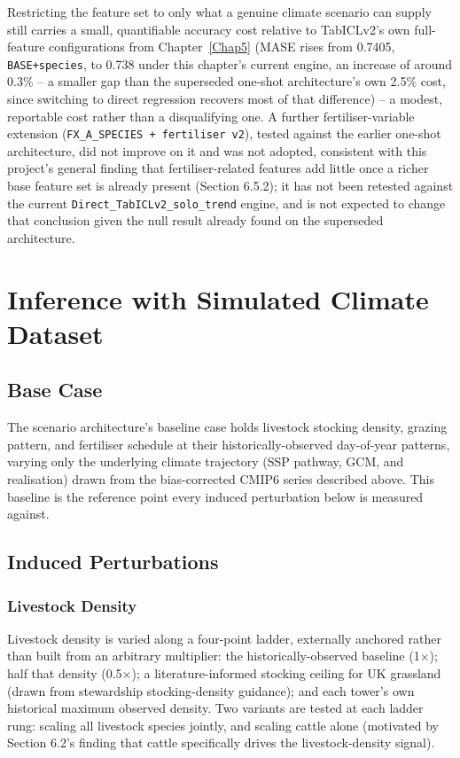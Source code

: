 Restricting the feature set to only what a genuine climate scenario can supply still carries a
small, quantifiable accuracy cost relative to TabICLv2's own full-feature configurations from
Chapter~\ref{Chap5} (MASE rises from 0.7405, \texttt{BASE+species}, to 0.738 under this chapter's
current engine, an increase of around 0.3\% -- a smaller gap than the superseded one-shot
architecture's own 2.5\% cost, since switching to direct regression recovers most of that
difference) -- a modest, reportable cost rather than a disqualifying one. A further
fertiliser-variable extension (\texttt{FX\_A\_SPECIES + fertiliser v2}), tested against the earlier
one-shot architecture, did not improve on it and was not adopted, consistent with this project's
general finding that fertiliser-related features add little once a richer base feature set is
already present (Section 6.5.2); it has not been retested against the current
\texttt{Direct\_TabICLv2\_solo\_trend} engine, and is not expected to change that conclusion given
the null result already found on the superseded architecture.

\section{Inference with Simulated Climate Dataset}

\subsection{Base Case}

The scenario architecture's baseline case holds livestock stocking density, grazing pattern, and
fertiliser schedule at their historically-observed day-of-year patterns, varying only the underlying
climate trajectory (SSP pathway, GCM, and realisation) drawn from the bias-corrected CMIP6 series
described above. This baseline is the reference point every induced perturbation below is measured
against.

\subsection{Induced Perturbations}

\subsubsection{Livestock Density}

Livestock density is varied along a four-point ladder, externally anchored rather than built from
an arbitrary multiplier: the historically-observed baseline (1$\times$); half that density
(0.5$\times$); a literature-informed stocking ceiling for UK grassland (drawn from stewardship
stocking-density guidance); and each tower's own historical maximum observed density. Two variants
are tested at each ladder rung: scaling all livestock species jointly, and scaling cattle alone
(motivated by Section 6.2's finding that cattle specifically drives the livestock-density signal).


